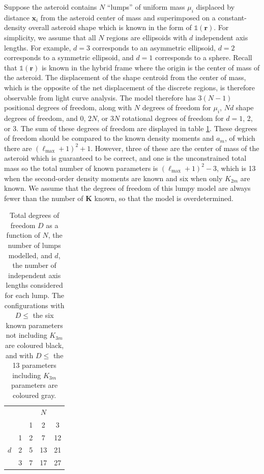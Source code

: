\documentclass[fleqn,usenatbib]{mnras}
\begin{document}
Suppose the asteroid contains $N$ ``lumps'' of uniform mass $\mu_i$ displaced by distance $\bm x_i$ from the asteroid center of mass and superimposed on a constant-density overall asteroid shape which is known in the form of $\mathds{1}(\bm r)$. For simplicity, we assume that all $N$ regions are ellipsoids with $d$ independent axis lengths. For example, $d=3$ corresponds to an asymmetric ellipsoid, $d=2$ corresponds to a symmetric ellipsoid, and $d=1$ corresponds to a sphere. Recall that $\mathds{1}(\bm r)$ is known in the hybrid frame where the origin is the center of mass of the asteroid. The displacement of the shape centroid from the center of mass, which is the opposite of the net displacement of the discrete regions, is therefore observable from light curve analysis. The model therefore has $3(N-1)$ positional degrees of freedom, along with $N$ degrees of freedom for $\mu_i$, $Nd$ shape degrees of freedom, and 0, $2N$, or $3N$ rotational degrees of freedom for $d=1$, 2, or 3. The sum of these degrees of freedom are displayed in table \ref{tab:lump-dof}. These degrees of freedom should be compared to the known density moments and $a_m$, of which there are $(\ell_\text{max}+1)^2+1$. However, three of these are the center of mass of the asteroid which is guaranteed to be correct, and one is the unconstrained total mass so the total number of known parameters is $(\ell_\text{max}+1)^2 - 3$, which is 13 when the second-order density moments are known and six when only $K_{2m}$ are known. We assume that the degrees of freedom of this lumpy model are always fewer than the number of $\bm K$ known, so that the model is overdetermined.

\begin{table}
  \centering
  \begin{tabular}{cc|ccc}
    \hline \hline
        &  & & $N$ &  \\
        &  & 1  & 2  & 3  \\ \hline 
        & 1& \cellcolor{black}\color{white} 2 & \cellcolor{gray}\color{white} 7 & \cellcolor{gray}\color{white} 12\\
    $d$ & 2& \cellcolor{black}\color{white} 5 & \cellcolor{gray}\color{white} 13 & 21 \\
        & 3& \cellcolor{gray}\color{white}  7 &  17 &  27 \\
    \hline \hline
  \end{tabular}
  \caption{Total degrees of freedom $D$ as a function of $N$, the number of lumps modelled, and $d$, the number of independent axis lengths considered for each lump. The configurations with $D \leq$ the six known parameters not including $K_{3m}$ are coloured black, and with $D \leq$ the 13 parameters including $K_{3m}$ parameters are coloured gray.}
  \label{tab:lump-dof}
\end{table}
\end{document}
